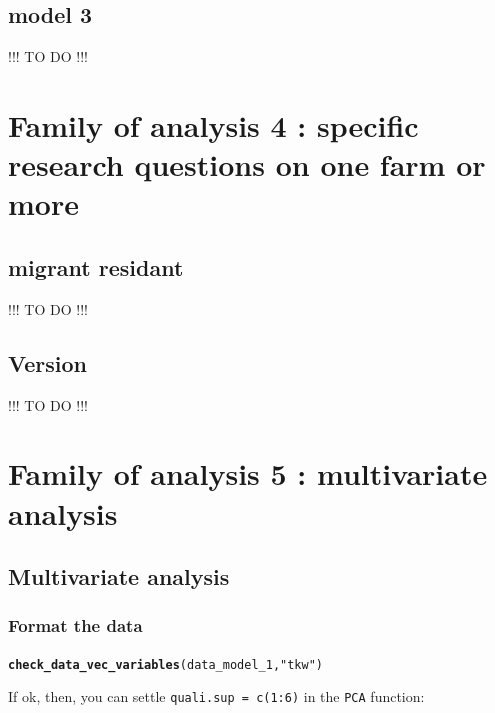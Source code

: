 \documentclass{article}\usepackage[]{graphicx}\usepackage[]{color}
\makeatletter
\newcommand{\hlstr}[1]{\textcolor[rgb]{0.192,0.494,0.8}{#1}}%
\newcommand{\hlstd}[1]{\textcolor[rgb]{0.345,0.345,0.345}{#1}}%
\newcommand{\hlkwd}[1]{\textcolor[rgb]{0.737,0.353,0.396}{\textbf{#1}}}%
\newenvironment{kframe}{%
 \def\at@end@of@kframe{}%
 \ifinner\ifhmode%
  \def\at@end@of@kframe{\end{minipage}}%
  \begin{minipage}{\columnwidth}%
 \fi\fi%
 \def\FrameCommand##1{\hskip\@totalleftmargin \hskip-\fboxsep
 \colorbox{shadecolor}{##1}\hskip-\fboxsep
     \hskip-\linewidth \hskip-\@totalleftmargin \hskip\columnwidth}%
 \MakeFramed {\advance\hsize-\width
   \@totalleftmargin\z@ \linewidth\hsize
   \@setminipage}}%
 {\par\unskip\endMakeFramed%
 \at@end@of@kframe}
\newenvironment{knitrout}{}{} %
\makeatother
\begin{document}
\subsection{model 3 }
\label{model_3}

!!! TO DO !!!

\newpage

\section{Family of analysis 4 : specific research questions on one farm or more}


\subsection{migrant residant}
\label{migrant_residant}

!!! TO DO !!!

\newpage


\subsection{Version}
\label{version}


!!! TO DO !!!
\newpage

\section{Family of analysis 5 : multivariate analysis}

\subsection{Multivariate analysis}
\label{multivariate_analysis}

\subsubsection{Format the data}

\begin{knitrout}
\color{fgcolor}\begin{kframe}
\begin{alltt}
\hlkwd{check_data_vec_variables}\hlstd{(data_model_1,} \hlstr{"tkw"}\hlstd{)}
\end{alltt}
\end{kframe}
\end{knitrout}

If ok, then, you can settle \texttt{quali.sup = c(1:6)} in the \texttt{PCA} function:
\end{document}
